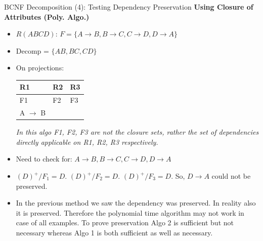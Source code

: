 \documentclass[aspectratio=169, xcolor=dvipsnames]{beamer}
\begin{document}
\begin{frame}{BCNF Decomposition (4): Testing Dependency Preservation}
    \textbf{Using Closure of Attributes (Poly. Algo.)}
    \begin{itemize}[<+->]
        \item $R (ABCD)$: $F = \{A \rightarrow B, B \rightarrow C, C \rightarrow D, D \rightarrow A\}$
        \item Decomp = $\{AB, BC, CD\}$
        \item On projections:
        \begin{table}
        \centering
        \begin{tabular}{lll}
        \toprule
        \textbf{R1} & \textbf{R2} & \textbf{R3} \\
        \midrule
        F1 & F2 & F3 \\
        A $\rightarrow$ B & & \\
        \bottomrule
        \end{tabular}
        \end{table}
        \textit{In this algo F1, F2, F3 are not the closure sets, rather the set of dependencies directly applicable on R1, R2, R3 respectively.}
        \item Need to check for: $A \rightarrow B, B \rightarrow C, C \rightarrow D, D \rightarrow A$
        \item $(D)^+ / F_1 = D$. $(D)^+ / F_2 = D$. $(D)^+ / F_3 = D$. So, $D \rightarrow A$ could not be preserved.
        \item In the previous method we saw the dependency was preserved. In reality also it is preserved. Therefore the polynomial time algorithm may not work in case of all examples. To prove preservation Algo 2 is sufficient but not necessary whereas Algo 1 is both sufficient as well as necessary.
    \end{itemize}
\end{frame}
\end{document}
